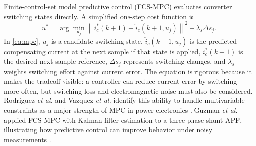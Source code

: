 \documentclass[conference]{IEEEtran}
\begin{document}
Finite-control-set model predictive control (FCS-MPC) evaluates converter switching states directly. A simplified one-step cost function is
\begin{equation}
u^{*}=\arg\min_{u_j}\left\|i_c^{*}(k+1)-\hat{i}_c(k+1,u_j)\right\|^2+\lambda_s\Delta s_j.
\label{eq:mpc}
\end{equation}
In \eqref{eq:mpc}, $u_j$ is a candidate switching state, $\hat{i}_c(k+1,u_j)$ is the predicted compensating current at the next sample if that state is applied, $i_c^{*}(k+1)$ is the desired next-sample reference, $\Delta s_j$ represents switching changes, and $\lambda_s$ weights switching effort against current error. The equation is rigorous because it makes the tradeoff visible: a controller can reduce current error by switching more often, but switching loss and electromagnetic noise must also be considered. Rodriguez \textit{et al.} and Vazquez \textit{et al.} identify this ability to handle multivariable constraints as a major strength of MPC in power electronics \cite{Rodriguez2013,Vazquez2014}. Guzman \textit{et al.} applied FCS-MPC with Kalman-filter estimation to a three-phase shunt APF, illustrating how predictive control can improve behavior under noisy measurements \cite{Guzman2017}.
\end{document}
